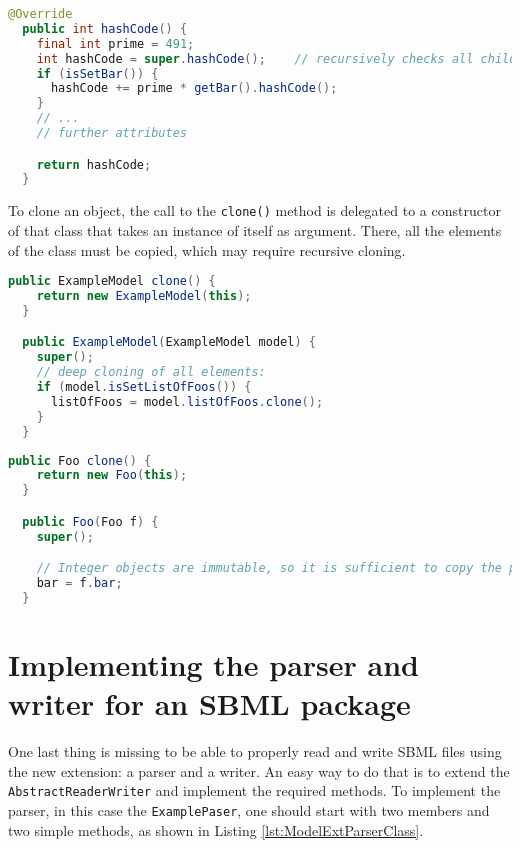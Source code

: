 \begin{lstlisting}[language=Java,caption={Example of the \texttt{hashCode}
method. The variable \texttt{prime} should be a large prime number to prevent
collisions},label={lst:ModelExtHashCode}]
  @Override
  public int hashCode() {
    final int prime = 491;
    int hashCode = super.hashCode();    // recursively checks all children
    if (isSetBar()) {
      hashCode += prime * getBar().hashCode();
    }
    // ...
    // further attributes

    return hashCode;
  }
\end{lstlisting}

To clone an object, the call to the \texttt{clone()} method is delegated to a
constructor of that class that takes an instance of itself as argument.
There, all the elements of the class must be copied, which may require recursive cloning.

\begin{lstlisting}[language=Java,caption={Example of the \texttt{clone} method
for the \texttt{ExampleModel} class},label={lst:ModelExtClone}]
  public ExampleModel clone() {
    return new ExampleModel(this);
  }

  public ExampleModel(ExampleModel model) {
    super();
    // deep cloning of all elements:
    if (model.isSetListOfFoos()) {
      listOfFoos = model.listOfFoos.clone();
    }
  }
\end{lstlisting}

\begin{lstlisting}[language=Java,caption={Example of the \texttt{clone} method
for the \texttt{Foo} class},label={lst:ModelExtCloneFoo}]
  public Foo clone() {
    return new Foo(this);
  }

  public Foo(Foo f) {
    super();

    // Integer objects are immutable, so it is sufficient to copy the pointer
    bar = f.bar;
  }
\end{lstlisting}


\section{Implementing the parser and writer for an SBML package}

One last thing is missing to be able to properly read and write SBML files
using the new extension: a parser and a writer. An easy way to do that is to
extend the \texttt{AbstractReaderWriter} and implement the required methods. To
implement the parser, in this case the \texttt{ExamplePaser}, one should start with two members and two simple methods, as shown in Listing \ref{lst:ModelExtParserClass}.

